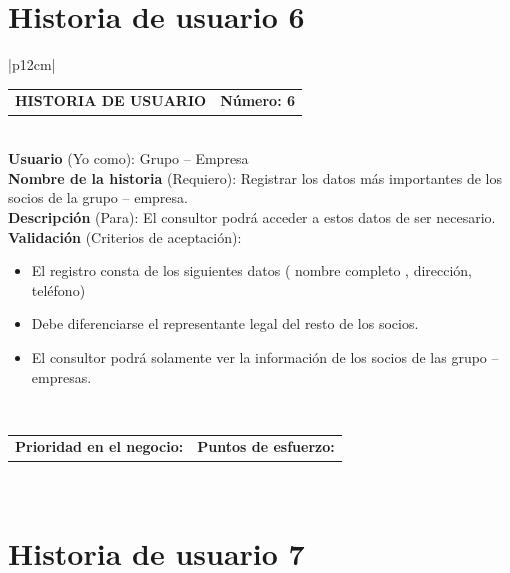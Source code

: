 \documentclass[11pt,letterpaper]{report}
\begin{document}
	\section{Historia de usuario 6}
	\begin{center}	
		\begin{tabular}{|p{12cm}|}
			\hline
			\begin{tabular}{c|c}
				\textbf{HISTORIA DE USUARIO} & \textbf{Número: 6} \\
			\end{tabular} \\ \hline
			\textbf{Usuario} (Yo como): Grupo – Empresa \\ \hline
			\textbf{Nombre de la historia} (Requiero): Registrar los datos más importantes de los socios de la grupo – empresa. \\ \hline
			\textbf{Descripción} (Para): El consultor podrá acceder a estos datos de ser necesario. \\ \hline
			\textbf{Validación} (Criterios de aceptación): \\
			\begin{minipage}{12cm}
				\begin{itemize}
					\item El registro consta de los siguientes datos ( nombre completo , dirección, teléfono)
					\item Debe diferenciarse el representante legal del resto de los socios.
					\item El consultor podrá solamente ver la información de los socios de las grupo – empresas.
				\end{itemize}
			\end{minipage} \\ \hline
			\begin{tabular}{c|c}
				\textbf{Prioridad en el negocio: } & \textbf{Puntos de esfuerzo: } \\
			\end{tabular} \\ \hline
		\end{tabular}
	\end{center}
	
	\section{Historia de usuario 7}
	
\end{document}
